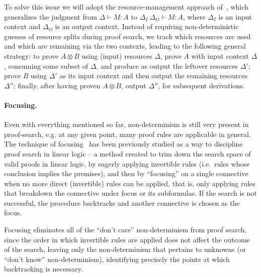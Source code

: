 \documentclass{llncs}
\newcommand{\tensor}{\otimes}
\newcommand{\mypara}[1]{\paragraph{\textbf{#1}.}}
\begin{document}
To solve this issue we will adopt the resource-management
approach
of~\cite{DBLP:journals/tcs/CervesatoHP00,DBLP:conf/lics/LiangM09},
which generalizes the judgment  from $\Delta \vdash M : A$ to
$\Delta_I \ \Delta_O \vdash M : A$, where $\Delta_I$ is an input
context and $\Delta_O$ is an output context.
Instead of requiring non-deterministic guesses of resource splits
during proof search, we track which resources are used and which are
remaining via the two contexts, leading to the following general strategy: to
prove $A\tensor B$ using (input) resources $\Delta$, prove $A$ with
input context $\Delta$,
consuming some subset of $\Delta$, and produce as output the leftover
resources $\Delta'$; prove $B$ using $\Delta'$ as its input context and then output the
remaining resources $\Delta''$; finally, after having proven
$A\tensor B$, output $\Delta''$, for subsequent derivations.


\mypara{Focusing}

Even with everything mentioned so far, non-determinism is still very
present in proof-search, e.g. at any given point, many proof
rules are applicable in general. The technique of focusing~\cite{10.1093/logcom/2.3.297,DBLP:conf/cade/ChaudhuriP05}
has been previously studied as a way to discipline proof search in
linear logic -- a method created to trim down the search space of
valid proofs in linear logic, by eagerly applying invertible rules
(i.e.~rules whose conclusion implies the premises), and then by
``focusing'' on a single connective when no more direct (invertible)
rules can be applied, that is, only applying rules that breakdown
the connective under focus or its subformulas. If the search is not
successful, the procedure backtracks and another connective is
chosen as the focus.

Focusing eliminates all of the ``don't care'' non-determinism from
proof search, since the order in which invertible rules are applied
does not affect the outcome of the search, leaving only the
non-determinism that pertains to unknowns (or ``don't know''
non-determinism), identifying precisely the points at which
backtracking is necessary.
\end{document}
